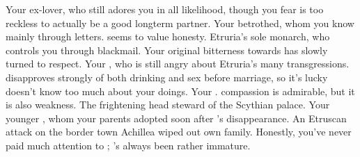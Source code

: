 \documentclass[char]{Kos}
\begin{document}
\begin{contacts}
\contact{\cPoet{}} Your ex-lover, who still adores you in all likelihood, though you fear \cPoet{\they} is too reckless to actually be a good longterm partner.
\contact{\cGroom{}} Your betrothed, whom you know mainly through letters. \cGroom{\they} seems to value honesty.
\contact{\cEtruriaKing{}} Etruria's sole monarch, who controls you through blackmail. Your original bitterness towards \cEtruriaKing{\them} has slowly turned to respect.
\contact{\cScythiaQueen{}} Your \cScythiaQueen{\parent}, who is still angry about Etruria's many transgressions. \cScythiaQueen{} disapproves strongly of both drinking and sex before marriage, so it's lucky \cScythiaQueen{\they} doesn't know too much about your doings.
\contact{\cScythiaKing{}} Your \cScythiaKing{\parent}. \cScythiaKing{\Their} compassion is admirable, but it is also \cScythiaKing{\their} weakness.
\contact{\cButler{}} The frightening head steward of the Scythian palace.
\contact{\cWard{}} Your younger \cWard{\sibling}, whom your parents adopted soon after \cFugitive{}'s disappearance. An Etruscan attack on the border town Achillea wiped out \cWard{\their} own family. Honestly, you've never paid much attention to \cWard{\them}; \cWard{\they}'s always been rather immature.
\end{contacts}
\end{document}

